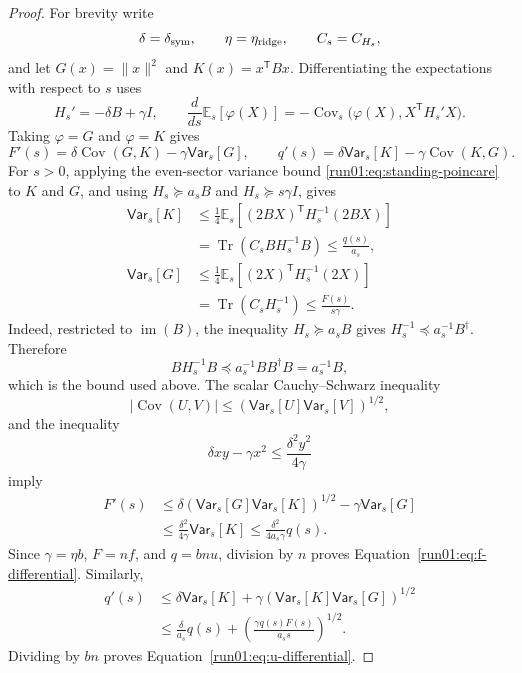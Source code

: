 \documentclass[11pt]{article}
\numberwithin{equation}{section}
\theoremstyle{definition}
\newcommand{\E}[2]{\mathbb{E}_{#1}\left[#2\right]}
\newcommand{\V}[2]{\mathsf{Var}_{#1}\left[#2\right]}
\begin{document}
\begin{proof}
For brevity write
\[
\delta=\delta_{\rm sym},
\qquad
\eta=\eta_{\rm ridge},
\qquad
C_s=C_{H_s},
\]
and let $G(x)=\|x\|^2$ and
$K(x)=x^{\mathsf T} Bx$.
Differentiating the expectations with respect to $s$ uses
\[
H_s'=-\delta B+\gamma I,
\qquad
\frac{d}{ds}\E{s}{\varphi(X)} =-\operatorname{Cov}_s \bigl(\varphi(X),X^{\mathsf T}H_s'X\bigr).
\]
Taking $\varphi=G$ and
$\varphi=K$ gives
\[
F'(s)=\delta\operatorname{Cov}(G,K)-\gamma\V{s}{G},
\qquad
q'(s)=\delta\V{s}{K}-\gamma\operatorname{Cov}(K,G).
\]
For $s>0$, applying the even-sector variance bound
\eqref{run01:eq:standing-poincare} to
$K$ and
$G$, and using
$H_s\succeq a_sB$ and
$H_s\succeq s\gamma I$, gives
\[
 \begin{aligned}
 \V{s}{K}
 &\leq\frac14\E{s}
 {(2BX)^{\mathsf T}H_s^{-1}(2BX)}\\
 &=\operatorname{Tr}(C_sBH_s^{-1}B)
 \leq \frac{q(s)}{a_s},\\
 \V{s}{G}
 &\leq\frac14\E{s}
 {(2X)^{\mathsf T}H_s^{-1}(2X)}\\
 &=\operatorname{Tr}(C_sH_s^{-1})
 \leq \frac{F(s)}{s\gamma}.
 \end{aligned}
\]
Indeed, restricted to $\operatorname{im}(B)$, the inequality
$H_s\succeq a_sB$ gives
$H_s^{-1}\preceq a_s^{-1}B^\dagger$.
Therefore
\[
BH_s^{-1}B
\preceq a_s^{-1}BB^\dagger B
=a_s^{-1}B,
\]
which is the bound used above.
The scalar Cauchy--Schwarz inequality
\[
 |\operatorname{Cov}(U,V)|
 \leq(\V{s}{U}\V{s}{V})^{1/2},
\]
and the inequality
\[
 \delta xy-\gamma x^2\leq\frac{\delta^2y^2}{4\gamma}
\]
imply
\[
 \begin{aligned}
 F'(s)
 &\leq
 \delta(\V{s}{G}\V{s}{K})^{1/2}
 -\gamma\V{s}{G}\\
 &\leq \frac{\delta^2}{4\gamma}\V{s}{K}
 \leq \frac{\delta^2}{4a_s\gamma}q(s).
 \end{aligned}
\]
Since $\gamma=\eta b$,
$F=nf$, and
$q=bnu$, division by
$n$ proves Equation~\eqref{run01:eq:f-differential}.
Similarly,
\[
 \begin{aligned}
 q'(s)
 &\leq\delta\V{s}{K}
 +\gamma(\V{s}{K}\V{s}{G})^{1/2}\\
 &\leq\frac{\delta}{a_s}q(s)
 +\left(\frac{\gamma q(s)F(s)}{a_s s}\right)^{1/2}.
 \end{aligned}
\]
Dividing by $bn$ proves Equation~\eqref{run01:eq:u-differential}.


\end{proof}
\end{document}
